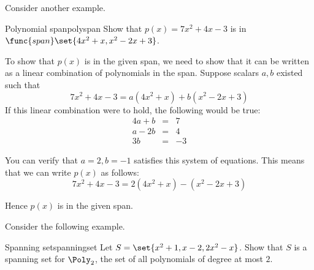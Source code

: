 Consider another example. 

\begin{example}{Polynomial span}{polyspan}
Show that $p(x) = 7x^2 + 4x - 3$ is in $\func{span}\set{4x^2 + x, x^2 -2x + 3 }$. 
\end{example}

\begin{solution}
To show that $p(x)$ is in the given span, we need to show that it can be written as a linear combination of polynomials in the span. Suppose scalars $a, b$ existed such that 
\[
7x^2 +4x - 3= a(4x^2+x) + b (x^2-2x+3) 
\]
If this linear combination were to hold, the following would be true:
\begin{eqnarray*}
4a + b &=& 7 \\
a - 2b &=& 4 \\
3b &=& -3 
\end{eqnarray*}

You can verify that $a = 2, b = -1$ satisfies this system of equations. This means that we can write $p(x)$ as follows:
\[
 7x^2 +4x-3= 2(4x^2+x)  - (x^2-2x+3) 
\]

Hence $p(x)$ is in the given span.
\end{solution}

Consider the following example.

\begin{example}{Spanning set}{spanningset}
Let $S = \set{x^2 + 1, x-2, 2x^2 - x }$. Show that $S$ is a spanning set for $\Poly_2$, the set of all polynomials of degree at most $2$. 
\end{example}


